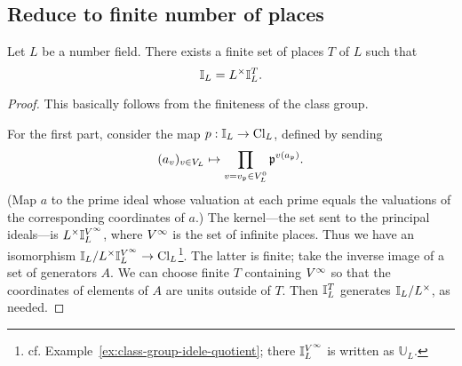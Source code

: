 \subsection{Reduce to finite number of places}
\begin{pr}
Let $L$ be a number field. 
There exists a finite set of places $T$ of $L$ such that
\[
\mathbb{I}_L=L^{\times} \mathbb{I}_L^T.
\]
\end{pr}
\begin{proof}
This basically follows from the finiteness of the class group.

For the first part, consider the map $p:\mathbb{I}_L\to \operatorname{Cl}_L$, defined by sending
\[
(a_v)_{v\in V_L}\mapsto \prod_{v=v_{\mathfrak{p}}\in V_L^0}\mathfrak{p}^{v(a_{\mathfrak{p}})}.
\]
(Map $a$ to the prime ideal whose valuation at each prime equals the valuations of the corresponding coordinates of $a$.)
The kernel---the set sent to the principal ideals---is $L^{\times}\mathbb{I}_L^{V^{\infty}}$, where $V^{\infty}$ is the set of infinite places. 
Thus we have an isomorphism $\mathbb{I}_L/L^{\times}\mathbb{I}_L^{V^{\infty}}\to \operatorname{Cl}_L$\footnote{cf. Example~\ref{ex:class-group-idele-quotient}; there $\mathbb{I}_L^{V^{\infty}}$ is written as $\mathbb U_L$.}. The latter is finite; take the inverse image of a set of generators $A$. We can choose finite $T$ containing $V^{\infty}$ so that the coordinates of elements of $A$ are units outside of $T$. Then $\mathbb{I}_L^T$ generates $\mathbb{I}_L/L^{\times}$, as needed.
%
\end{proof}
